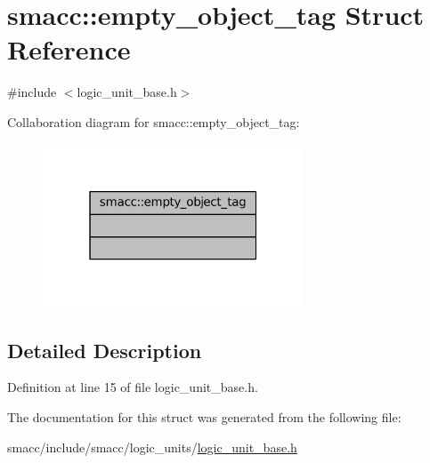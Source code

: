 \hypertarget{structsmacc_1_1empty__object__tag}{}\section{smacc\+:\+:empty\+\_\+object\+\_\+tag Struct Reference}
\label{structsmacc_1_1empty__object__tag}


{\ttfamily \#include $<$logic\+\_\+unit\+\_\+base.\+h$>$}



Collaboration diagram for smacc\+:\+:empty\+\_\+object\+\_\+tag\+:
\nopagebreak
\begin{figure}[H]
\begin{center}
\leavevmode
\includegraphics[width=220pt]{structsmacc_1_1empty__object__tag__coll__graph}
\end{center}
\end{figure}


\subsection{Detailed Description}


Definition at line 15 of file logic\+\_\+unit\+\_\+base.\+h.



The documentation for this struct was generated from the following file\+:\begin{DoxyCompactItemize}
\item 
smacc/include/smacc/logic\+\_\+units/\hyperlink{logic__unit__base_8h}{logic\+\_\+unit\+\_\+base.\+h}\end{DoxyCompactItemize}

